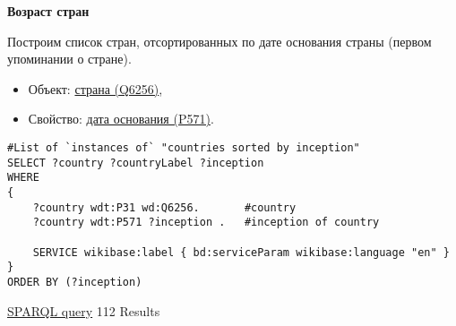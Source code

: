\textbf{Возраст стран}

Построим список стран, отсортированных по дате основания страны (первом упоминании о стране).

\begin{itemize}
    \item Объект: \href{https://www.wikidata.org/wiki/Q6256}{страна (Q6256)},
    \item Свойство: \href{https://www.wikidata.org/wiki/Property:P571}{дата основания (P571)}.
\end{itemize}

\begin{lstlisting}[language=SPARQL]
#List of `instances of` "countries sorted by inception" 
SELECT ?country ?countryLabel ?inception
WHERE
{
    ?country wdt:P31 wd:Q6256.       #country
    ?country wdt:P571 ?inception .   #inception of country
    
    SERVICE wikibase:label { bd:serviceParam wikibase:language "en" }
}
ORDER BY (?inception)
\end{lstlisting}


\href{https://query.wikidata.org/#%23List%20of%20%60instances%20of%60%20%22countries%20sorted%20by%20inception%22%20%0ASELECT%20%3Fcountry%20%3FcountryLabel%20%3Finception%0AWHERE%0A%7B%0A%20%20%20%20%3Fcountry%20wdt%3AP31%20wd%3AQ6256.%0A%20%20%20%20%3Fcountry%20wdt%3AP571%20%3Finception%20.%0A%20%20%20%20%0A%20%20%20%20SERVICE%20wikibase%3Alabel%20%7B%20bd%3AserviceParam%20wikibase%3Alanguage%20%22en%22%20%7D%0A%7D%0A%0AORDER%20BY%20%28%3Finception%29}{SPARQL query} 112 Results